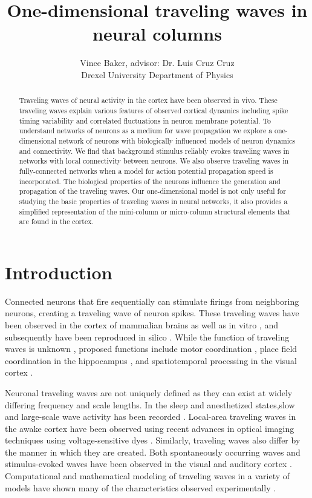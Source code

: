 \documentclass[a4paper,11pt]{article}
\title{One-dimensional traveling waves in neural columns}
\author{Vince Baker, advisor: Dr. Luis Cruz Cruz\\ Drexel University Department of Physics}
\begin{document}
\maketitle

\begin{abstract}
Traveling waves of neural activity in the cortex have been observed in vivo.
These traveling waves explain various features of observed cortical dynamics including spike timing variability and correlated fluctuations in neuron membrane potential.
To understand networks of neurons as a medium for wave propagation we explore a one-dimensional network of neurons with biologically influenced models of neuron dynamics and connectivity.
We find that background stimulus reliably evokes traveling waves in networks with local connectivity between neurons.
We also observe traveling waves in fully-connected networks when a model for action potential propagation speed is incorporated.
The biological properties of the neurons influence the generation and propagation of the traveling waves. 
Our one-dimensional model is not only useful for studying the basic properties of traveling waves in neural networks, it also provides a simplified representation of the mini-column or micro-column structural elements that are found in the cortex.

\end{abstract}

\section{Introduction} 
Connected neurons that fire sequentially can stimulate firings from neighboring neurons, creating a traveling wave of neuron spikes. 
These traveling waves have been observed in the cortex of mammalian brains \cite{muller2018}\cite{reimer2010}  as well as in vitro \cite{wu2008}\cite{huang2004}, and subsequently have been reproduced in silico \cite{keane2015}\cite{senk2020}. 
While the function of traveling waves is unknown \cite{wu2008}\cite{muller2018}, proposed functions include motor coordination \cite{sanes1993}, place field coordination in the hippocampus \cite{lubernov2009}, and spatiotemporal processing in the visual cortex \cite{wu2008}\cite{muller2014}. 

Neuronal traveling waves are not uniquely defined as they can exist at widely differing frequency and scale lengths.  
In the sleep and anesthetized states,slow and large-scale wave activity has been recorded \cite{muller2018}. 
Local-area traveling waves in the awake cortex have been observed using recent advances in optical imaging techniques using voltage-sensitive dyes \cite{wu2008}\cite{shoham1999}.  
Similarly, traveling waves also differ by the manner in which they are created. 
Both spontaneously occurring waves and stimulus-evoked \cite{reimer2010} waves have been observed in the visual and auditory cortex . 
Computational and mathematical modeling of traveling waves in a variety of models have shown many of the characteristics observed experimentally \cite{ermentrout2001}\cite{keane2015}\cite{gibson2009}.
\end{document}
